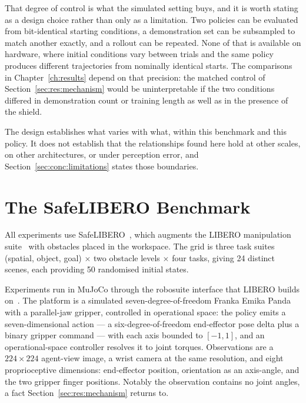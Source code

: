 \documentclass[a4paper,11pt]{report}
\begin{document}
That degree of control is what the simulated setting buys, and it is worth stating as a design
choice rather than only as a limitation. Two policies can be evaluated from bit-identical starting
conditions, a demonstration set can be subsampled to match another exactly, and a rollout can be
repeated. None of that is available on hardware, where initial conditions vary between trials and
the same policy produces different trajectories from nominally identical starts. The comparisons in
Chapter~\ref{ch:results} depend on that precision: the matched control of
Section~\ref{sec:res:mechanism} would be uninterpretable if the two conditions differed in
demonstration count or training length as well as in the presence of the shield.

The design establishes what varies with what, within this benchmark and this policy. It does not
establish that the relationships found here hold at other scales, on other architectures, or under
perception error, and Section~\ref{sec:conc:limitations} states those boundaries.

\section{The SafeLIBERO Benchmark}\label{sec:benchmark}

All experiments use SafeLIBERO~\cite{vlsa2026}, which augments the LIBERO manipulation
suite~\cite{liu2023libero} with obstacles placed in the workspace. The grid is three
task suites (spatial, object, goal) $\times$ two obstacle levels $\times$ four tasks, giving 24
distinct scenes, each providing 50 randomised initial states.

Experiments run in MuJoCo through the robosuite interface that LIBERO builds
on~\cite{liu2023libero}. The platform is a simulated seven-degree-of-freedom Franka Emika Panda
with a parallel-jaw gripper, controlled in operational space: the policy emits a seven-dimensional
action --- a six-degree-of-freedom end-effector pose delta plus a binary gripper command --- with
each axis bounded to $[-1, 1]$, and an operational-space controller resolves it to joint torques.
Observations are a $224 \times 224$ agent-view image, a wrist camera at the same resolution, and
eight proprioceptive dimensions: end-effector position, orientation as an axis-angle, and the two
gripper finger positions. Notably the observation contains no joint angles, a fact
Section~\ref{sec:res:mechanism} returns to.
\end{document}
